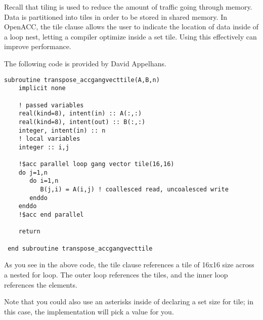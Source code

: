 Recall that tiling is used to reduce the amount of traffic going through memory. Data is partitioned into tiles in order to be stored in shared memory. In OpenACC, the tile clause allows the user to indicate the location of data inside of a loop nest, letting a compiler optimize inside a set tile. Using this effectively can improve performance. 

The following code is provided by David Appelhans. 

\begin{Code}
\begin{lstlisting}[frame=single, caption=tiling with matrix transpose, label=prototype, numbers=none]
subroutine transpose_accgangvecttile(A,B,n) 
    implicit none

    ! passed variables
    real(kind=8), intent(in) :: A(:,:)
    real(kind=8), intent(out) :: B(:,:)   
    integer, intent(in) :: n
    ! local variables
    integer :: i,j

    !$acc parallel loop gang vector tile(16,16)
    do j=1,n
       do i=1,n
          B(j,i) = A(i,j) ! coallesced read, uncoalesced write
       enddo
    enddo
    !$acc end parallel
    
    return

 end subroutine transpose_accgangvecttile
\end{lstlisting}
\end{Code}

As you see in the above code, the tile clause references a tile of 16x16 size across a nested for loop. The outer loop references the tiles, and the inner loop references the elements. 

Note that you could also use an asterisks inside of declaring a set size for tile; in this case, the implementation will pick a value for you. 